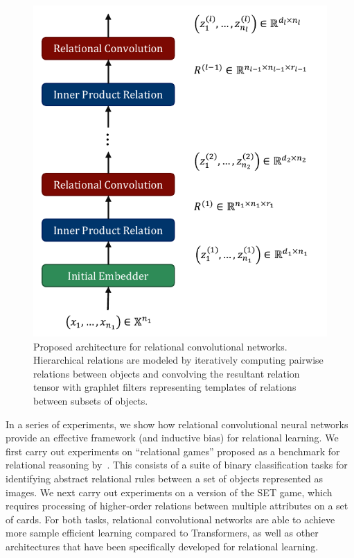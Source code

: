 \begin{figure}
    \centering
    \includegraphics[width=.5\textwidth]{figs/relconv_architecture.pdf}
    \caption{Proposed architecture for relational convolutional networks. Hierarchical relations are modeled by iteratively computing pairwise relations between objects and convolving the resultant relation tensor with graphlet filters representing templates of relations between subsets of objects.
    }\label{fig:relconv_architecture}
\end{figure}

In a series of experiments, we show how relational convolutional neural networks provide an effective framework (and inductive bias) for relational learning. We first carry out experiments on ``relational games'' proposed as a benchmark for relational reasoning by~\citep{shanahanExplicitlyRelationalNeural}. This consists of a suite of binary classification tasks for identifying abstract relational rules between a set of objects represented as images. We next carry out experiments on a version of the SET game, which requires processing of  higher-order relations between multiple attributes on a set of cards. For both tasks, relational convolutional networks are able to achieve more sample efficient learning compared to Transformers, as well as other architectures that have been specifically developed for relational learning.


